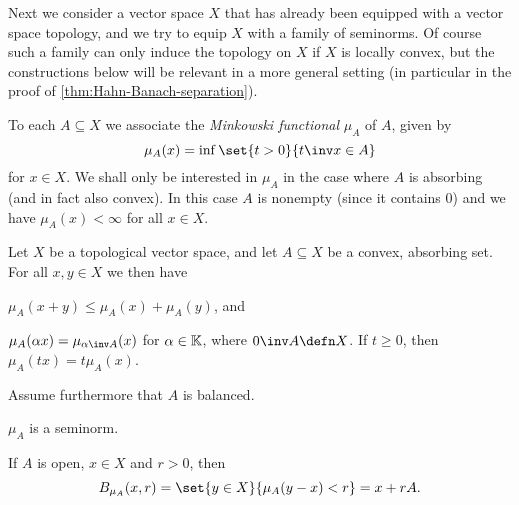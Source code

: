 \documentclass[article, a4paper, 11pt, oneside]{memoir}
\numberwithin{equation}{chapter}
\begin{document}
\newcommand{\ev}{\mathrm{ev}}

Next we consider a vector space $X$ that has already been equipped with a vector space topology, and we try to equip $X$ with a family of seminorms. Of course such a family can only induce the topology on $X$ if $X$ is locally convex, but the constructions below will be relevant in a more general setting (in particular in the proof of \cref{thm:Hahn-Banach-separation}).

To each $A \subseteq X$ we associate the \emph{Minkowski functional} $\mu_A$ of $A$, given by
%
\begin{equation*}
    \mu_A(x)
        = \inf \set{t > 0}{t\inv x \in A}
\end{equation*}
%
for $x \in X$. We shall only be interested in $\mu_A$ in the case where $A$ is absorbing (and in fact also convex). In this case $A$ is nonempty (since it contains $0$) and we have $\mu_A(x) < \infty$ for all $x \in X$.

\begin{lemma}
    Let $X$ be a topological vector space, and let $A \subseteq X$ be a convex, absorbing set. For all $x, y \in X$ we then have
    \begin{enumlem}
        \item \label{enum:Minkowski-functional-sublinear} $\mu_A(x + y) \leq \mu_A(x) + \mu_A(y)$, and
        
        \item \label{enum:Minkowski-functional-homogeneous} $\mu_A(\alpha x) = \mu_{\alpha\inv A}(x)$ for $\alpha \in \mathbb{K}$, where $0\inv A \defn X$. If $t \geq 0$, then $\mu_A(tx) = t\mu_A(x)$.
    \end{enumlem}
    Assume furthermore that $A$ is balanced.
    \begin{enumlem}[resume]
        \item \label{enum:Minkowski-functional-seminorm} $\mu_A$ is a seminorm.
        
        \item \label{enum:Minkowski-functional-balls} If $A$ is open, $x \in X$ and $r > 0$, then
        \begin{equation*}
            \ball[\mu_A]{x}{r}
                = \set{y \in X}{\mu_A(y-x) < r}
                = x + rA.
        \end{equation*}
    \end{enumlem}
\end{lemma}
\end{document}
